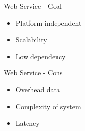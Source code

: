 \begin{frame}{Web Service - Goal}
    \begin{itemize}
      \item Platform independent
      \item Scalability
      \item Low dependency
    \end{itemize}
\end{frame}

\begin{frame}{Web Service - Cons}
    \begin{itemize}
      \item Overhead data
      \item Complexity of system
      \item Latency
    \end{itemize}
\end{frame}
